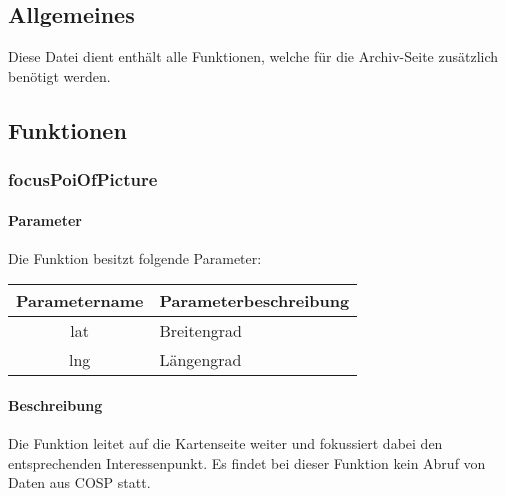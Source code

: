 \subsection{Allgemeines} Diese Datei dient enthält alle Funktionen, welche für die Archiv-Seite zusätzlich benötigt werden.
\newpage
\subsection{Funktionen}
\subsubsection{focusPoiOfPicture}
\paragraph{Parameter} Die Funktion besitzt folgende Parameter:
\begin{table}[H]
	\begin{tabular}{|c|p{11cm}|}
		\hline
		\textbf{Parametername} & \textbf{Parameterbeschreibung} \\ \hline
		lat & Breitengrad \\ \hline
		lng & Längengrad \\ \hline
	\end{tabular}
\end{table}
\paragraph{Beschreibung} Die Funktion leitet auf die Kartenseite weiter und fokussiert dabei den entsprechenden Interessenpunkt. Es findet bei dieser Funktion kein Abruf von Daten aus {\glqq COSP\grqq} statt.